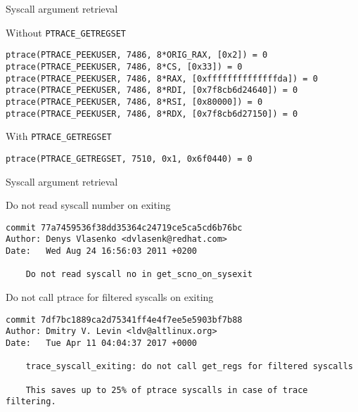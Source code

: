 \documentclass[unicode,aspectratio=169]{beamer}
\begin{document}
\begin{frame}[fragile]{Syscall argument retrieval}
\begin{block}{\large Without \texttt{PTRACE\_GETREGSET}}
\begin{scriptsize}
\begin{verbatim}
ptrace(PTRACE_PEEKUSER, 7486, 8*ORIG_RAX, [0x2]) = 0
ptrace(PTRACE_PEEKUSER, 7486, 8*CS, [0x33]) = 0
ptrace(PTRACE_PEEKUSER, 7486, 8*RAX, [0xffffffffffffffda]) = 0
ptrace(PTRACE_PEEKUSER, 7486, 8*RDI, [0x7f8cb6d24640]) = 0
ptrace(PTRACE_PEEKUSER, 7486, 8*RSI, [0x80000]) = 0
ptrace(PTRACE_PEEKUSER, 7486, 8*RDX, [0x7f8cb6d27150]) = 0
\end{verbatim}
\end{scriptsize}
\end{block}
\begin{block}{\large With \texttt{PTRACE\_GETREGSET}}
\begin{scriptsize}
\begin{verbatim}
ptrace(PTRACE_GETREGSET, 7510, 0x1, 0x6f0440) = 0
\end{verbatim}
\end{scriptsize}
\end{block}
\end{frame}

\begin{frame}[fragile]{Syscall argument retrieval}
\begin{block}{\large Do not read syscall number on exiting}
\begin{scriptsize}
\begin{verbatim}
commit 77a7459536f38dd35364c24719ce5ca5cd6b76bc
Author: Denys Vlasenko <dvlasenk@redhat.com>
Date:   Wed Aug 24 16:56:03 2011 +0200

    Do not read syscall no in get_scno_on_sysexit
\end{verbatim}
\end{scriptsize}
\end{block}

\begin{block}{\large Do not call ptrace for filtered syscalls on exiting}
\begin{scriptsize}
\begin{verbatim}
commit 7df7bc1889ca2d75341ff4e4f7ee5e5903bf7b88
Author: Dmitry V. Levin <ldv@altlinux.org>
Date:   Tue Apr 11 04:04:37 2017 +0000

    trace_syscall_exiting: do not call get_regs for filtered syscalls
    
    This saves up to 25% of ptrace syscalls in case of trace filtering.
\end{verbatim}
\end{scriptsize}
\end{block}
\end{frame}
\end{document}
